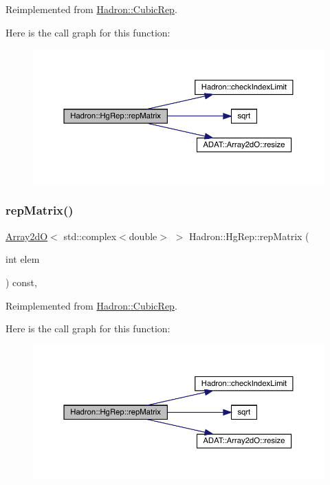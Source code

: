 Reimplemented from \mbox{\hyperlink{structHadron_1_1CubicRep_ac5d7e9e6f4ab1158b5fce3e4ad9e8005}{Hadron\+::\+Cubic\+Rep}}.

Here is the call graph for this function\+:
\nopagebreak
\begin{figure}[H]
\begin{center}
\leavevmode
\includegraphics[width=350pt]{d5/d3a/structHadron_1_1HgRep_a1ca0a9c28a8e0a9aba561029b7e61f08_cgraph}
\end{center}
\end{figure}
\mbox{\label{structHadron_1_1HgRep_a1ca0a9c28a8e0a9aba561029b7e61f08}} 
\subsubsection{\texorpdfstring{repMatrix()}{repMatrix()}\hspace{0.1cm}{\footnotesize\ttfamily [2/2]}}
{\footnotesize\ttfamily \mbox{\hyperlink{classADAT_1_1Array2dO}{Array2dO}}$<$ std\+::complex$<$double$>$ $>$ Hadron\+::\+Hg\+Rep\+::rep\+Matrix (\begin{DoxyParamCaption}\item[{int}]{elem }\end{DoxyParamCaption}) const\hspace{0.3cm}{\ttfamily [inline]}, {\ttfamily [virtual]}}



Reimplemented from \mbox{\hyperlink{structHadron_1_1CubicRep_ac5d7e9e6f4ab1158b5fce3e4ad9e8005}{Hadron\+::\+Cubic\+Rep}}.

Here is the call graph for this function\+:
\nopagebreak
\begin{figure}[H]
\begin{center}
\leavevmode
\includegraphics[width=350pt]{d5/d3a/structHadron_1_1HgRep_a1ca0a9c28a8e0a9aba561029b7e61f08_cgraph}
\end{center}
\end{figure}


